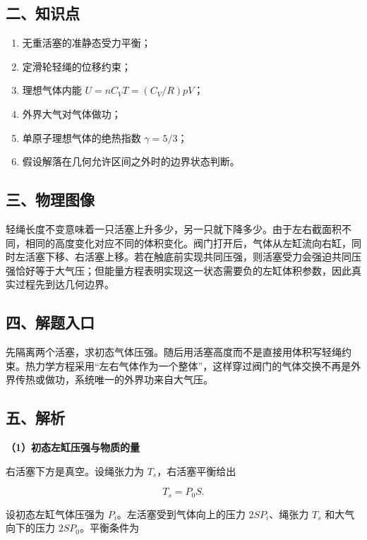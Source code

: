\documentclass[12pt,a4paper,UTF8]{ctexart}
\newcommand{\tightlist}{\setlength{\itemsep}{0pt}\setlength{\parskip}{0pt}}
\begin{document}
\subsection{二、知识点}\label{ux4e8cux77e5ux8bc6ux70b9-2}

\begin{enumerate}
\def\labelenumi{\arabic{enumi}.}
\tightlist
\item
  无重活塞的准静态受力平衡；
\item
  定滑轮轻绳的位移约束；
\item
  理想气体内能 \(U=nC_VT=(C_V/R)pV\)；
\item
  外界大气对气体做功；
\item
  单原子理想气体的绝热指数 \(\gamma=5/3\)；
\item
  假设解落在几何允许区间之外时的边界状态判断。
\end{enumerate}

\subsection{三、物理图像}\label{ux4e09ux7269ux7406ux56feux50cf-2}

轻绳长度不变意味着一只活塞上升多少，另一只就下降多少。由于左右截面积不同，相同的高度变化对应不同的体积变化。阀门打开后，气体从左缸流向右缸，同时左活塞下移、右活塞上移。若在触底前实现共同压强，则活塞受力会强迫共同压强恰好等于大气压；但能量方程表明实现这一状态需要负的左缸体积参数，因此真实过程先到达几何边界。

\subsection{四、解题入口}\label{ux56dbux89e3ux9898ux5165ux53e3-2}

先隔离两个活塞，求初态气体压强。随后用活塞高度而不是直接用体积写轻绳约束。热力学方程采用``左右气体作为一个整体''，这样穿过阀门的气体交换不再是外界传热或做功，系统唯一的外界功来自大气压。

\subsection{五、解析}\label{ux4e94ux89e3ux6790-2}

\textbf{（1）初态左缸压强与物质的量}

右活塞下方是真空。设绳张力为 \(T_s\)，右活塞平衡给出

\[
T_s=P_0S.
\tag{1}
\]

设初态左缸气体压强为 \(P_i\)。左活塞受到气体向上的压力 \(2SP_i\)、绳张力
\(T_s\) 和大气向下的压力 \(2SP_0\)。平衡条件为
\end{document}
